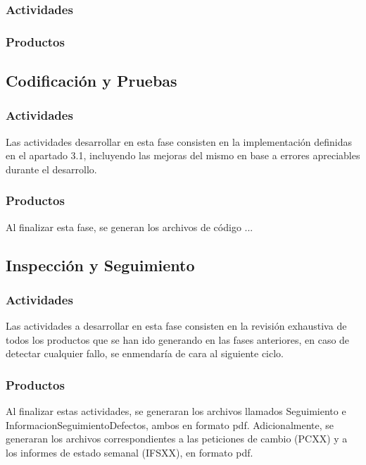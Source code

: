 \documentclass[titlepage,a4paper]{article}
\begin{document}
\subsubsection{Actividades}

\subsubsection{Productos}

\subsection{Codificación y Pruebas}

\subsubsection{Actividades}
Las actividades desarrollar en esta fase consisten en la implementación definidas en el apartado 3.1, incluyendo las mejoras del mismo en base a errores apreciables durante el desarrollo.
\subsubsection{Productos}
Al finalizar esta fase, se generan los archivos de código ...

\subsection{Inspección y Seguimiento}

\subsubsection{Actividades}
Las actividades a desarrollar en esta fase consisten en la revisión exhaustiva de todos los productos que se han ido generando en las fases anteriores, en caso de detectar cualquier fallo, se enmendaría de cara al siguiente ciclo.
\subsubsection{Productos}

Al finalizar estas actividades, se generaran los archivos llamados Seguimiento e InformacionSeguimientoDefectos, ambos en formato pdf. Adicionalmente, se generaran los archivos correspondientes a las peticiones de cambio (PCXX) y a los informes de estado semanal (IFSXX), en formato pdf.
\end{document}
